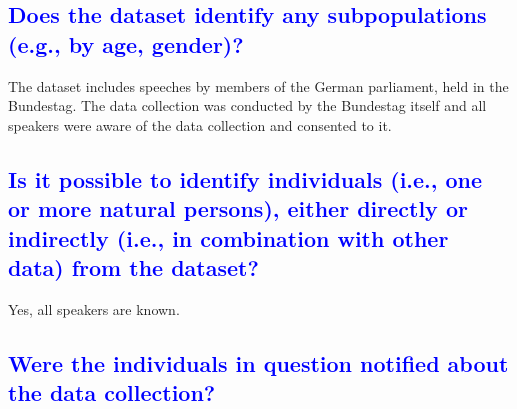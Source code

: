 \documentclass[letterpaper, 10 pt, conference]{ieeeconf}  %
\begin{document}
\textcolor{blue}{\subsection{Does the dataset identify any subpopulations (e.g., by age, gender)?}} %

The dataset includes speeches by members of the German parliament, held in the Bundestag.
The data collection was conducted by the Bundestag itself and all speakers were aware of the data collection and consented to it. 


\textcolor{blue}{\subsection{Is it possible to identify individuals (i.e., one or more natural persons), either directly or indirectly (i.e., in combination with other
data) from the dataset?}} %

Yes, all speakers are known.







\textcolor{blue}{\subsection{Were the individuals in question notified about the data collection?}}
\end{document}
